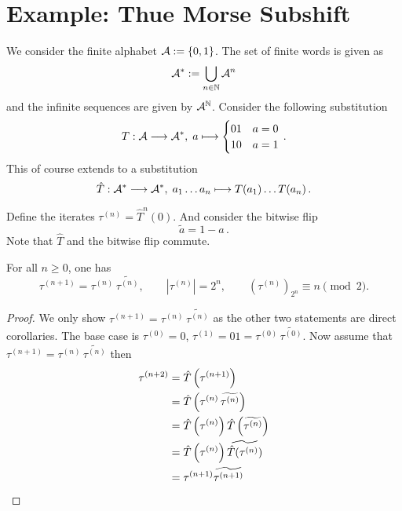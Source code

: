 \section{Example: Thue Morse Subshift}

We consider the finite alphabet $\mathcal{A} := \{ 0, 1 \}$.
The set of finite words is given as
\[ \mathcal{A}^* := \bigcup_{n\in\mathbb{N}} \mathcal{A}^n \]
and the infinite sequences are given by $\mathcal{A}^{\mathbb{N}}$.
Consider the following substitution
\[ T: \mathcal{A} \longrightarrow \mathcal{A}^*,\; a \longmapsto	\begin{cases} 01 & a=0 \\ 10 & a=1 \end{cases} \,.\]
This of course extends to a substitution
\[ \hat T: \mathcal{A}^* \longrightarrow \mathcal{A}^*,\; a_1\ldots a_n \longmapsto	T(a_1)\ldots T(a_n) \,. \]

Define the iterates $\tau^{(n)} = {\hat T}^n(0)$.
And consider the bitwise flip
\[ \widetilde{a} = 1-a \,.\]
Note that $\hat T$ and the bitwise flip commute.

\begin{lemma}
	\label{lem:tm-recursion}
	For all $n \geqslant 0$, one has
	\[
	\tau^{(n+1)} = \tau^{(n)}\,\widetilde{\tau^{(n)}},
	\qquad |\tau^{(n)}|=2^n,
	\qquad (\tau^{(n)})_{2^n}\equiv n\pmod2.
	\]
\end{lemma}
\begin{proof}
	We only show $\tau^{(n+1)} = \tau^{(n)}\,\widetilde{\tau^{(n)}}$ as the other two statements are direct corollaries.
	The base case is $\tau^{(0)}=0$, $\tau^{(1)}=01=\tau^{(0)}\,\widetilde{\tau^{(0)}}$.
	Now assume that 
	$\tau^{(n+1)} = \tau^{(n)}\,\widetilde{\tau^{(n)}}$
	then
	\begin{align*}
		\tau^{(n+2)} &= \hat T\left(\tau^{(n+1)}\right)\\
		&= \hat T\left( \tau^{(n)}\,\widetilde{\tau^{(n)}}\right)\\
		&= \hat T\left( \tau^{(n)} \right) \hat T\left(\widetilde{\tau^{(n)}}\right)\\
		&= \hat T\left( \tau^{(n)} \right) \widetilde{\hat T(\tau^{(n)})}\\
		&= \tau^{(n+1)} \widetilde{\tau^{(n+1)}} \qedhere
	\end{align*}
\end{proof}

